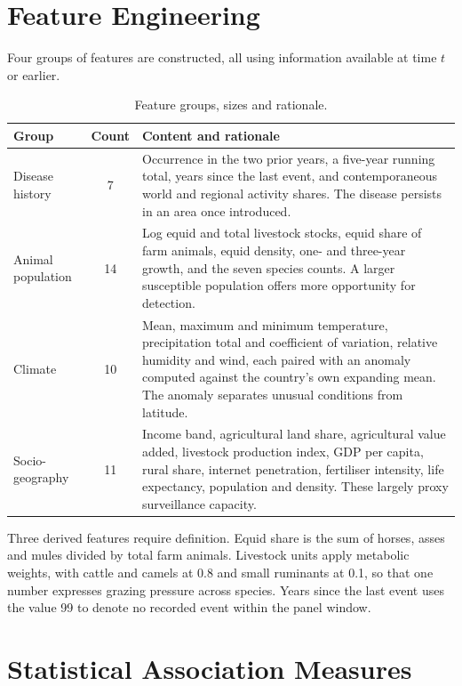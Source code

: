 \documentclass[10pt,openany]{report}
\begin{document}
\section{Feature Engineering}

Four groups of features are constructed, all using information available at time $t$ or earlier.

\begin{table}[htbp]
\centering
\caption{Feature groups, sizes and rationale.}
\label{tab:features}
\small
\begin{tabular}{@{}p{2.7cm}cp{9.6cm}@{}}
\toprule
\textbf{Group} & \textbf{Count} & \textbf{Content and rationale} \\
\midrule
Disease history & 7 & Occurrence in the two prior years, a five-year running total, years since the last event, and contemporaneous world and regional activity shares. The disease persists in an area once introduced. \\
Animal population & 14 & Log equid and total livestock stocks, equid share of farm animals, equid density, one- and three-year growth, and the seven species counts. A larger susceptible population offers more opportunity for detection. \\
Climate & 10 & Mean, maximum and minimum temperature, precipitation total and coefficient of variation, relative humidity and wind, each paired with an anomaly computed against the country's own expanding mean. The anomaly separates unusual conditions from latitude. \\
Socio-geography & 11 & Income band, agricultural land share, agricultural value added, livestock production index, GDP per capita, rural share, internet penetration, fertiliser intensity, life expectancy, population and density. These largely proxy surveillance capacity. \\
\bottomrule
\end{tabular}
\end{table}

Three derived features require definition. Equid share is the sum of horses, asses and mules
divided by total farm animals. Livestock units apply metabolic weights, with cattle and camels at
0.8 and small ruminants at 0.1, so that one number expresses grazing pressure across species.
Years since the last event uses the value 99 to denote no recorded event within the panel window.

\section{Statistical Association Measures}
\label{sec:assoc}
\end{document}
